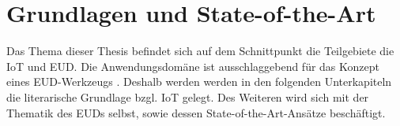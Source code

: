 \chapter{Grundlagen und State-of-the-Art}\label{GrundlagenSOTA}
Das Thema dieser Thesis befindet sich auf dem Schnittpunkt die Teilgebiete die \ac{IoT} und \ac{EUD}. Die Anwendungsdomäne ist ausschlaggebend für das Konzept eines \ac{EUD}-Werkzeugs \cite{aghaee2013guidelines}. Deshalb werden werden in den folgenden Unterkapiteln die literarische Grundlage bzgl. \ac{IoT} gelegt. Des Weiteren wird sich mit der Thematik des \acp{EUD} selbst, sowie dessen State-of-the-Art-Ansätze beschäftigt.







